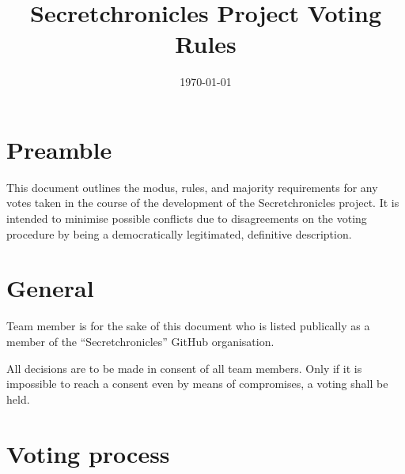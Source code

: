 \documentclass[10pt,a4paper,DIV=calc,headings=medium,twocolumn,draft]{scrartcl}
\begin{document}
\title{Secretchronicles Project Voting Rules}
\date{\today}
\maketitle{}

\section*{Preamble}

This document outlines the modus, rules, and majority requirements for
any votes taken in the course of the development of the
Secretchronicles project. It is intended to minimise possible
conflicts due to disagreements on the voting procedure by being a
democratically legitimated, definitive description.

\section{General}

\begin{contract}

  Team member is for the sake of this document who is listed
  publically as a member of the “Secretchronicles” GitHub
  organisation.


  All decisions are to be made in consent of all team members. Only if
  it is impossible to reach a consent even by means of compromises, a
  voting shall be held.
\end{contract}

\section{Voting process}
\end{document}
